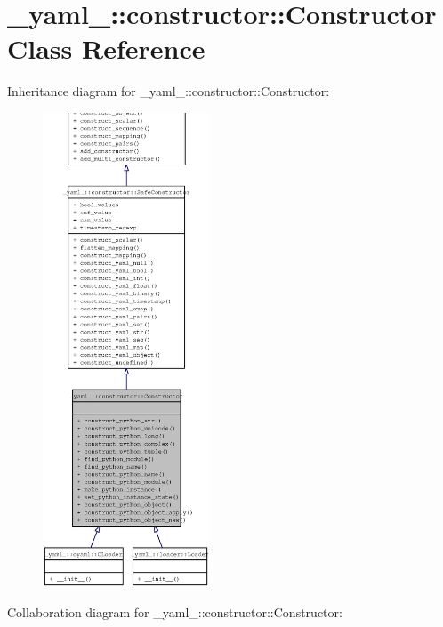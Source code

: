 \section{\_\-yaml\_\-::constructor::Constructor Class Reference}
\label{class__yaml___1_1constructor_1_1Constructor}
Inheritance diagram for \_\-yaml\_\-::constructor::Constructor:\nopagebreak
\begin{figure}[H]
\begin{center}
\leavevmode
\includegraphics[height=400pt]{class__yaml___1_1constructor_1_1Constructor__inherit__graph}
\end{center}
\end{figure}
Collaboration diagram for \_\-yaml\_\-::constructor::Constructor:\nopagebreak
